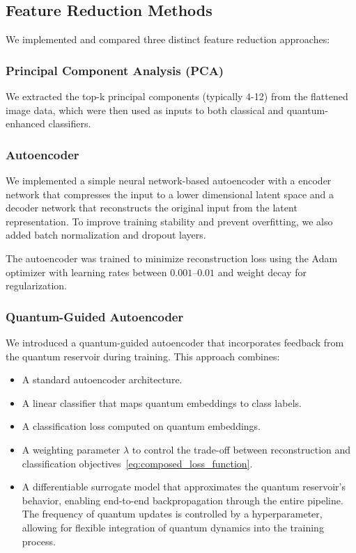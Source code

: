 \documentclass[conference]{IEEEtran}
\begin{document}
\subsection{Feature Reduction Methods}
We implemented and compared three distinct feature reduction approaches:
\subsubsection{Principal Component Analysis (PCA)}
We extracted the top-k principal components 
(typically 4-12) from the flattened image data, 
which were then used as inputs to both classical and 
quantum-enhanced classifiers.

\subsubsection{Autoencoder}
We implemented a simple neural network-based autoencoder with a encoder network that compresses the input to a lower dimensional latent space and a decoder network that reconstructs the original input from the latent representation. To improve training stability and prevent overfitting, we also added batch normalization and dropout layers.

The autoencoder was trained to minimize reconstruction loss using the Adam optimizer with learning rates between $0.001$--$0.01$ and weight decay for regularization.

\subsubsection{Quantum-Guided Autoencoder}
We introduced a quantum-guided autoencoder that incorporates feedback from the quantum reservoir during training. This approach combines:

\begin{itemize}
    \item A standard autoencoder architecture.
    \item A linear classifier that maps quantum embeddings to class labels.
    \item A classification loss computed on quantum embeddings.
    \item A weighting parameter $\lambda$ to control the trade-off between reconstruction and classification objectives~\ref{eq:composed_loss_function}.
    \item A differentiable surrogate model that approximates the quantum reservoir's behavior, enabling end-to-end backpropagation through the entire pipeline. The frequency of quantum updates is controlled by a hyperparameter, allowing for flexible integration of quantum dynamics into the training process.
\end{itemize}
\end{document}
